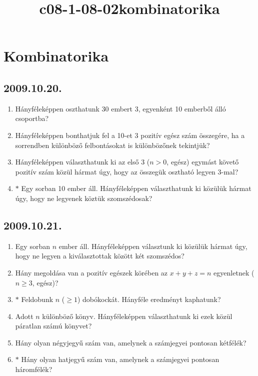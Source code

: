 \documentclass{article}
\title{c08-1-08-02kombinatorika}
\begin{document}
\section*{Kombinatorika}

\subsection*{2009.10.20.}
\begin{enumerate}
\item Hányféleképpen oszthatunk 30 embert 3, egyenként 10 emberből álló csoportba?
\item Hányféleképpen bonthatjuk fel a 10-et 3 pozitív egész szám összegére, ha a sorrendben különböző felbontásokat is különbözőnek tekintjük?
\item Hányféleképpen választhatunk ki az első 3 ($n>0$, egész) egymást követő pozitív szám közül hármat úgy, hogy az összegük osztható legyen 3-mal?
\item $*$ Egy sorban 10 ember áll. Hányféleképpen választhatunk ki közülük hármat úgy, hogy ne legyenek köztük szomszédosak?
\end{enumerate}

\subsection*{2009.10.21.}
\begin{enumerate}
\item Egy sorban $n$ ember áll. Hányféleképpen választunk ki közülük hármat úgy, hogy ne legyen a kiválasztottak között két szomszédos?
\item Hány megoldása van a pozitív egészek körében az $x+y+z=n$ egyenletnek ($n\geq 3$, egész)?
\item $*$ Feldobunk $n$ ($\geq 1$) dobókockát. Hányféle eredményt kaphatunk?
\item Adott $n$ különböző könyv. Hányféleképpen választhatunk ki ezek közül páratlan számú könyvet?
\item Hány olyan négyjegyű szám van, amelynek a számjegyei pontosan kétfélék?
\item $*$ Hány olyan hatjegyű szám van, amelynek a számjegyei pontosan háromfélék?
\end{enumerate}
\end{document}
